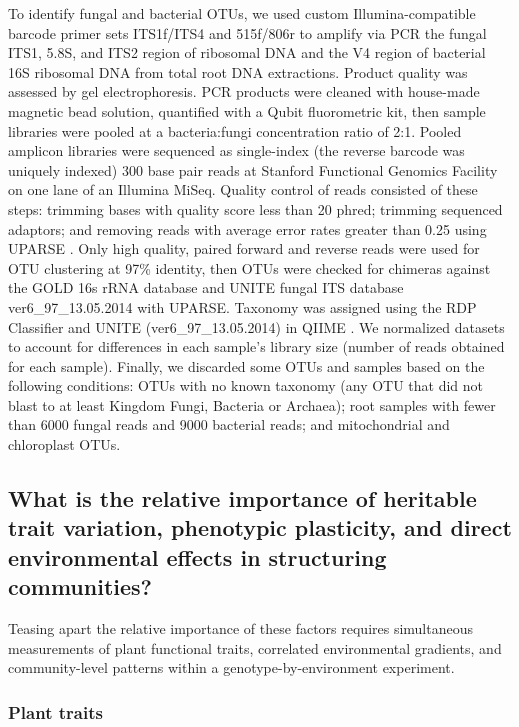 \documentclass[11pt]{article}
\begin{document}
To identify fungal and bacterial OTUs, we used custom
Illumina-compatible barcode primer sets ITS1f/ITS4 and 515f/806r
\cite{Caporaso_2012} to amplify via PCR the fungal ITS1, 5.8S, and ITS2
region of ribosomal DNA and the V4 region of bacterial 16S ribosomal DNA
from total root DNA extractions. Product quality was assessed by gel
electrophoresis. PCR products were cleaned with house-made magnetic bead
solution, quantified with a Qubit fluorometric kit, then sample
libraries were pooled at a bacteria:fungi concentration ratio of 2:1.
Pooled amplicon libraries were sequenced as single-index (the reverse
barcode was uniquely indexed) 300 base pair reads at Stanford Functional
Genomics Facility on one lane of an Illumina MiSeq. Quality control of
reads consisted of these steps: trimming bases with quality score less
than 20 phred; trimming sequenced adaptors; and removing reads with
average error rates greater than 0.25 using UPARSE \cite{Edgar_2013}.
Only high quality, paired forward and reverse reads were used for OTU
clustering at 97\% identity, then OTUs were checked for chimeras against
the GOLD 16s rRNA database \cite{reddy2014genomes} and UNITE fungal ITS
database ver6\_97\_13.05.2014 \cite{koljalg2005unite} with UPARSE. Taxonomy was
assigned using the RDP Classifier \cite{wang2007naive} and UNITE
(ver6\_97\_13.05.2014) in QIIME \cite{Caporaso_2010}. We normalized datasets
to account for differences in each sample's library size (number of
reads obtained for each sample). Finally, we discarded some OTUs and
samples based on the following conditions: OTUs with no known taxonomy
(any OTU that did not blast to at least Kingdom Fungi, Bacteria or
Archaea); root samples with fewer than 6000 fungal reads and 9000
bacterial reads; and mitochondrial and chloroplast OTUs.

\subsection*{What is the relative importance of heritable trait
variation, phenotypic plasticity, and direct environmental effects in
structuring
communities?}

Teasing apart the relative importance of these factors requires
simultaneous measurements of plant functional traits, correlated
environmental gradients, and community-level patterns within a
genotype-by-environment experiment.

\subsubsection*{Plant traits}
\end{document}
